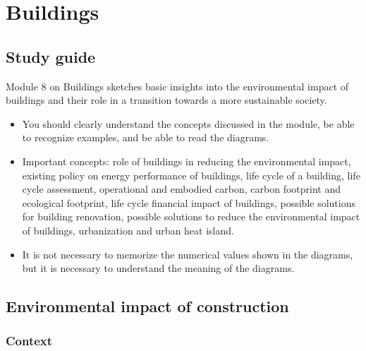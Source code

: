 \documentclass[../summary.tex]{subfiles}
\begin{document}
	
	\section{Buildings}
	
	\subsection{Study guide}
	
	Module 8 on Buildings sketches basic insights into the environmental impact of buildings and their role in a transition towards a more sustainable society. 
	
	\begin{itemize}
		\item You should clearly understand the concepts discussed in the module, be able to recognize examples, and be able to read the diagrams.
		\item Important concepts: role of buildings in reducing the environmental impact, existing policy on energy performance of buildings, life cycle of a building, life cycle assessment, operational and embodied carbon, carbon footprint and ecological footprint, life cycle financial impact of buildings, possible solutions for building renovation, possible solutions to reduce the environmental impact of buildings, urbanization and urban heat island.
		\item It is not necessary to memorize the numerical values shown in the diagrams, but it is necessary to understand the meaning of the diagrams.
	\end{itemize}
	
	\subsection{Environmental impact of construction}
	\subsubsection{Context}
	
\end{document}
